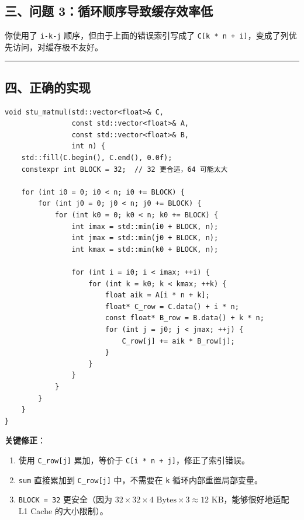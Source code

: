 \documentclass[11pt, a4paper]{article}
\begin{document}
\begin{aibox}
\subsection*{三、问题 3：循环顺序导致缓存效率低}

你使用了 \texttt{i-k-j} 顺序，但由于上面的错误索引写成了 \texttt{C[k * n + i]}，变成了列优先访问，对缓存极不友好。

\begin{center}\rule{\textwidth}{0.4pt}\end{center}

\subsection*{四、正确的实现}

\begin{tcolorbox}[colback=white,colframe=gray!50!white,boxrule=0.5pt,arc=2pt,left=5pt,right=5pt,top=5pt,bottom=5pt]
\begin{verbatim}
void stu_matmul(std::vector<float>& C,
                const std::vector<float>& A,
                const std::vector<float>& B,
                int n) {
    std::fill(C.begin(), C.end(), 0.0f);
    constexpr int BLOCK = 32;  // 32 更合适，64 可能太大
    
    for (int i0 = 0; i0 < n; i0 += BLOCK) {
        for (int j0 = 0; j0 < n; j0 += BLOCK) {
            for (int k0 = 0; k0 < n; k0 += BLOCK) {
                int imax = std::min(i0 + BLOCK, n);
                int jmax = std::min(j0 + BLOCK, n);
                int kmax = std::min(k0 + BLOCK, n);
                
                for (int i = i0; i < imax; ++i) {
                    for (int k = k0; k < kmax; ++k) {
                        float aik = A[i * n + k];
                        float* C_row = C.data() + i * n;
                        const float* B_row = B.data() + k * n;
                        for (int j = j0; j < jmax; ++j) {
                            C_row[j] += aik * B_row[j];
                        }
                    }
                }
            }
        }
    }
}
\end{verbatim}
\end{tcolorbox}

\textbf{关键修正}：
\begin{enumerate}
    \item 使用 \texttt{C\_row[j]} 累加，等价于 \texttt{C[i * n + j]}，修正了索引错误。
    \item \texttt{sum} 直接累加到 \texttt{C\_row[j]} 中，不需要在 \texttt{k} 循环内部重置局部变量。
    \item \texttt{BLOCK = 32} 更安全（因为 $32 \times 32 \times 4 \text{ Bytes} \times 3 \approx 12\text{ KB}$，能够很好地适配 L1 Cache 的大小限制）。
\end{enumerate}
\end{aibox}
\end{document}

